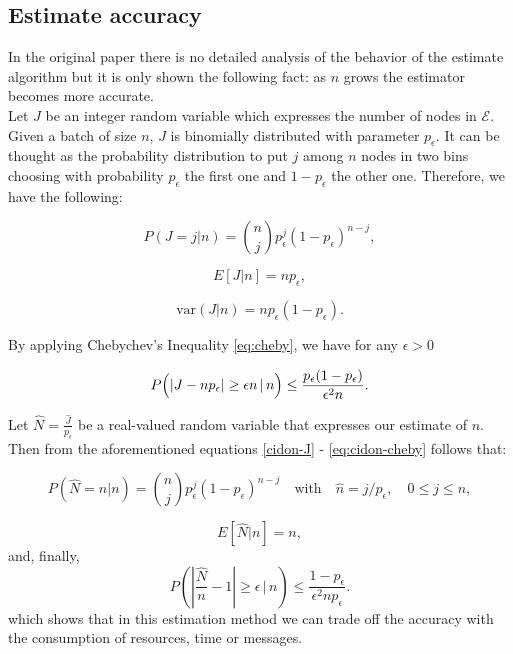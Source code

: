 \documentclass[11pt,a4paper,twoside,openright]{book}
\newcommand{\pc}{p_{\epsilon}}
\begin{document}
\subsection{Estimate accuracy}
\label{cidon-estimate-accuracy}

In the original paper \cite{cidon} there is no detailed analysis of the behavior of the estimate algorithm but it is only shown the following fact: as $n$ grows the estimator becomes more accurate.\\
    
Let $J$ be an integer random variable which expresses the number of nodes in $\mathcal{E}$. Given a batch of size $n$, $J$ is binomially distributed with parameter $\pc$. It can be thought as the probability distribution to put $j$ among  $n$ nodes in two bins choosing with probability $\pc$ the first one and $1-\pc$ the other one.  Therefore, we have the following:

\begin{equation}
	P(J=j|n)={n \choose j}\pc^{j}(1-\pc)^{n-j},
           \label{cidon-J}
\end{equation}

\begin{equation}
E[J|n]=n\pc ,
\label{cidon-e-estimate}
\end{equation}

\begin{equation}
\textrm{var}(J|n)=n\pc(1-\pc).
\end{equation}


By applying Chebychev's Inequality \eqref{eq:cheby},  we have for any $\epsilon>0$
 
 \begin{equation}
P\Bigl( \left| J-n\pc\right| \geq \epsilon n \,|\, n \Bigr) \leq \frac{\pc(1-\pc)}{\epsilon^{2}n}.
\label{eq:cidon-cheby}
 \end{equation}
 
 Let $\hat{N}={\displaystyle \frac{\hat{J}}{\pc}}$ be a real-valued random variable that expresses our estimate of $n$. Then from the aforementioned equations \eqref{cidon-J} - \eqref{eq:cidon-cheby} follows that:

\begin{equation}
P\left(\hat{N}=n|n\right)={n \choose j}\pc^{j}(1-\pc)^{n-j} \quad \textrm{with} \quad \hat{n}=j/\pc, \quad 0\leq j\leq n,
\end{equation}

\begin{equation}
E[\hat{N}|n]=n,
\end{equation}
and, finally,
 \begin{equation}
P\left( \left| \frac{\hat{N}}{n}-1\right| \geq \epsilon  \,\big|\, n \right) \leq \frac{1-\pc}{\epsilon^{2}n\pc}.
 \end{equation}
which shows that in this estimation method we can trade off the accuracy with the consumption of resources, time or messages.
\end{document}
